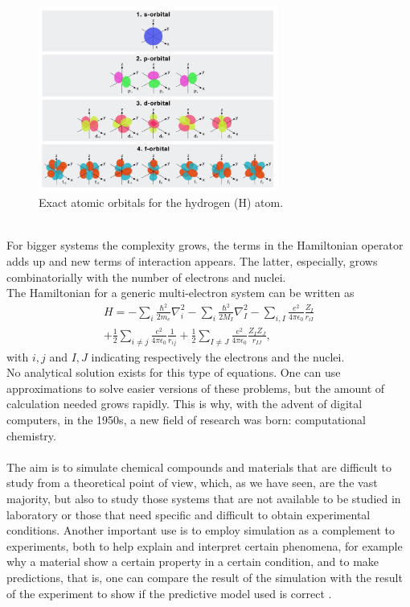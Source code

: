 \begin{figure}[ht]
  \centering
  \includegraphics[width=0.7\textwidth]{figures/Atomic orbitals.jpg}
  \caption{Exact atomic orbitals for the hydrogen (H) atom.} \label{Atomic orbitals}
\end{figure} \\
For bigger systems the complexity grows, the terms in the Hamiltonian operator adds up and new terms of interaction appears. The latter, especially, grows combinatorially with the number of electrons and nuclei. \\
The Hamiltonian for a generic multi-electron system can be written as
\begin{equation}\begin{split}
H = -\sum_{i} \frac{\hbar^2}{2m_e}\nabla^2_i
    -\sum_{i} \frac{\hbar^2}{2M_I}\nabla^2_I
    -\sum_{i,I} \frac{e^2}{4\pi\epsilon_0} \frac{Z_I}{r_{iI}} \\
    +\frac12 \sum_{i \neq j} \frac{e^2}{4\pi\epsilon_0} \frac{1}{r_{ij}}
    +\frac12 \sum_{I \neq J} \frac{e^2}{4\pi\epsilon_0} \frac{Z_I Z_J}{r_{IJ}},
\end{split}\end{equation}
with $i,j$ and $I,J$ indicating respectively the electrons and the nuclei. \\
No analytical solution exists for this type of equations. One can use approximations to solve easier versions of these problems, but the amount of calculation needed grows rapidly. This is why, with the advent of digital computers, in the 1950s, a new field of research was born: computational chemistry. \\
\\
The aim is to simulate chemical compounds and materials that are difficult to study from a theoretical point of view, which, as we have seen, are the vast majority, but also to study those systems that are not available to be studied in laboratory or those that need specific and difficult to obtain experimental conditions. Another important use is to employ simulation as a complement to experiments, both to help explain and interpret certain phenomena, for example why a material show a certain property in a certain condition, and to make predictions, that is, one can compare the result of the simulation with the result of the experiment to show if the predictive model used is correct \cite{Szabo1996Jul, Cramer2004Sep}. \\
